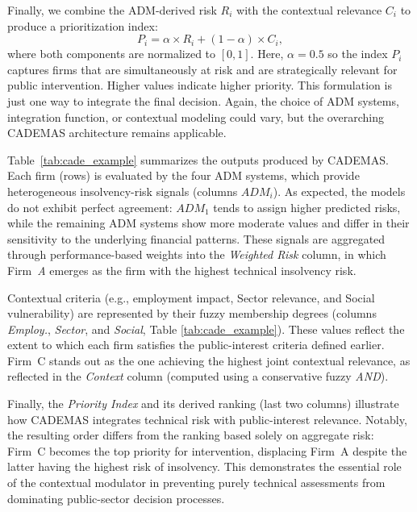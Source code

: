 \documentclass[letterpaper, 10 pt,conference]{IEEEconf}
\begin{document}
Finally, we combine the ADM-derived risk \(R_i\) with the contextual relevance \(C_i\) to produce a prioritization index:
\[
    P_i = \alpha \times R_i + (1-\alpha) \times C_i,
\]
where both components are normalized to \([0,1]\). Here, $\alpha = 0.5$ so the index \(P_i\) captures firms that are simultaneously at risk and are strategically relevant for public intervention. Higher values indicate higher priority. This formulation is just one way to integrate the final decision. Again, the choice of ADM systems, integration function, or contextual modeling could vary, but the overarching CADEMAS architecture remains applicable.





Table~\ref{tab:cade_example} summarizes the outputs produced by CADEMAS. Each firm (rows) is evaluated by the four ADM systems, which provide heterogeneous insolvency-risk signals (columns $ADM_i$). As expected, the models do not exhibit perfect agreement: $ADM_1$ tends to assign higher predicted risks, while the remaining ADM systems show more moderate values and differ in their sensitivity to the underlying financial patterns. These signals are aggregated through performance-based weights into the \textit{Weighted Risk} column, in which Firm~\textit{A} emerges as the firm with the highest technical insolvency risk.

Contextual criteria (e.g., employment impact, Sector relevance, and Social vulnerability) are represented by their fuzzy membership degrees (columns \textit{Employ.}, \textit{Sector}, and \textit{Social}, Table \ref{tab:cade_example}). These values reflect the extent to which each firm satisfies the public-interest criteria defined earlier. Firm~C stands out as the one achieving the highest joint contextual relevance, as reflected in the \textit{Context} column (computed using a conservative fuzzy \textit{AND}).

Finally, the \textit{Priority Index} and its derived ranking (last two columns) illustrate how CADEMAS integrates technical risk with public-interest relevance. Notably, the resulting order differs from the ranking based solely on aggregate risk: Firm~C becomes the top priority for intervention, displacing Firm~A despite the latter having the highest risk of insolvency. This demonstrates the essential role of the contextual modulator in preventing purely technical assessments from dominating public-sector decision processes.
\end{document}
